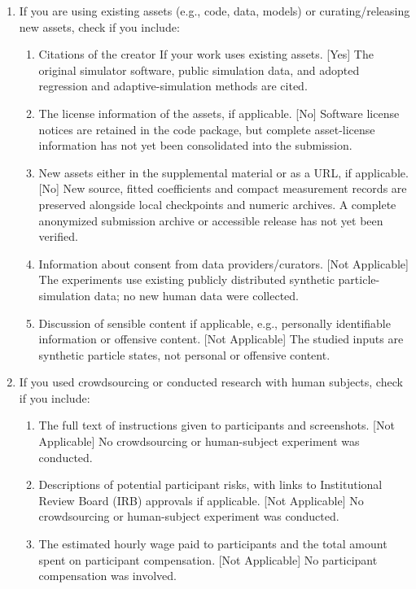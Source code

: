 \begin{enumerate}
  \item If you are using existing assets (e.g., code, data, models) or curating/releasing new assets, check if you include:
  \begin{enumerate}
    \item Citations of the creator If your work uses existing assets. [Yes] The original simulator software, public simulation data, and adopted regression and adaptive-simulation methods are cited.
    \item The license information of the assets, if applicable. [No] Software license notices are retained in the code package, but complete asset-license information has not yet been consolidated into the submission.
    \item New assets either in the supplemental material or as a URL, if applicable. [No] New source, fitted coefficients and compact measurement records are preserved alongside local checkpoints and numeric archives. A complete anonymized submission archive or accessible release has not yet been verified.
    \item Information about consent from data providers/curators. [Not Applicable] The experiments use existing publicly distributed synthetic particle-simulation data; no new human data were collected.
    \item Discussion of sensible content if applicable, e.g., personally identifiable information or offensive content. [Not Applicable] The studied inputs are synthetic particle states, not personal or offensive content.
  \end{enumerate}

  \item If you used crowdsourcing or conducted research with human subjects, check if you include:
  \begin{enumerate}
    \item The full text of instructions given to participants and screenshots. [Not Applicable] No crowdsourcing or human-subject experiment was conducted.
    \item Descriptions of potential participant risks, with links to Institutional Review Board (IRB) approvals if applicable. [Not Applicable] No crowdsourcing or human-subject experiment was conducted.
    \item The estimated hourly wage paid to participants and the total amount spent on participant compensation. [Not Applicable] No participant compensation was involved.
  \end{enumerate}

\end{enumerate}

